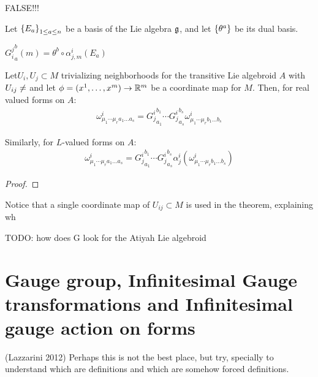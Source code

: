 {\color{gray} FALSE!!!

Let $\left\{ E_a \right\}_{1 \leq a \leq n}$ be a basis of the Lie algebra $\mathfrak{g}$, and let $\left\{ \theta^a \right\}$ be its dual basis.

\begin{definition}
    ${G_i^j}_a^b(m) = \theta^b \circ \alpha^i_{j, m}(E_a)$
\end{definition}

\begin{theorem}
Let$U_i, U_j \subset M$ trivializing neighborhoods for the transitive Lie algebroid $A$ with $U_{ij} \neq \empty$ and let $\phi = (x^1, \dots, x^m) \to \RR^m$ be a coordinate map for $M$. Then, for real valued forms on $A$:
\begin{align}
    \omega^i_{\mu_1 \cdots \mu_r a_1 \dots a_s} = {G^i_j}^{b_1}_{a_1} \cdots {G^i_j}^{b_s}_{a_s} \omega^i_{\mu_1 \cdots \mu_r b_1 \dots b_s}
\end{align}

Similarly, for $L$-valued forms on $A$:
\begin{align}
    \omega^i_{\mu_1 \cdots \mu_r a_1 \dots a_s} = {G^i_j}^{b_1}_{a_1} \cdots {G^i_j}^{b_s}_{a_s} \alpha^i_j(\omega^i_{\mu_1 \cdots \mu_r b_1 \dots b_s})
\end{align}
\end{theorem}
\begin{proof}

\end{proof}
\begin{remark}
Notice that a single coordinate map of $U_{ij} \subset M$ is used in the theorem, explaining wh
\end{remark}

TODO: how does G look for the Atiyah Lie algebroid}
\section{Gauge group, Infinitesimal Gauge transformations and Infinitesimal gauge action on forms}

(Lazzarini 2012) Perhaps this is not the best place, but try, specially to understand which are definitions and which are somehow forced definitions.

